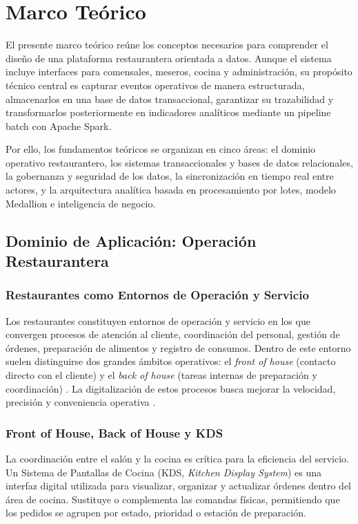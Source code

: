\section{Marco Teórico}

El presente marco teórico reúne los conceptos necesarios para comprender el diseño de
una plataforma restaurantera orientada a datos. Aunque el sistema incluye interfaces para
comensales, meseros, cocina y administración, su propósito técnico central es capturar
eventos operativos de manera estructurada, almacenarlos en una base de datos transaccional,
garantizar su trazabilidad y transformarlos posteriormente en indicadores analíticos mediante
un pipeline batch con Apache Spark.

Por ello, los fundamentos teóricos se organizan en cinco áreas: el dominio operativo
restaurantero, los sistemas transaccionales y bases de datos relacionales, la gobernanza y
seguridad de los datos, la sincronización en tiempo real entre actores, y la arquitectura
analítica basada en procesamiento por lotes, modelo Medallion e inteligencia de negocio.

\subsection{Dominio de Aplicación: Operación Restaurantera}

\subsubsection{Restaurantes como Entornos de Operación y Servicio}

Los restaurantes constituyen entornos de operaci\'on y servicio en los que convergen
procesos de atenci\'on al cliente, coordinaci\'on del personal, gesti\'on de \'ordenes,
preparaci\'on de alimentos y registro de consumos. Dentro de este entorno suelen
distinguirse dos grandes \'ambitos operativos: el \textit{front of house} (contacto directo
con el cliente) y el \textit{back of house} (tareas internas de preparaci\'on y
coordinaci\'on) \cite{lee_digital_2024}. La digitalizaci\'on de estos procesos busca
mejorar la velocidad, precisi\'on y conveniencia operativa \cite{nra_state_2023}.

\subsubsection{Front of House, Back of House y KDS}

La coordinaci\'on entre el sal\'on y la cocina es cr\'itica para la eficiencia del servicio.
Un Sistema de Pantallas de Cocina (KDS, \textit{Kitchen Display System}) es una interfaz
digital utilizada para visualizar, organizar y actualizar órdenes dentro del área de cocina.
Sustituye o complementa las comandas físicas, permitiendo que los pedidos se agrupen por
estado, prioridad o estación de preparación.

